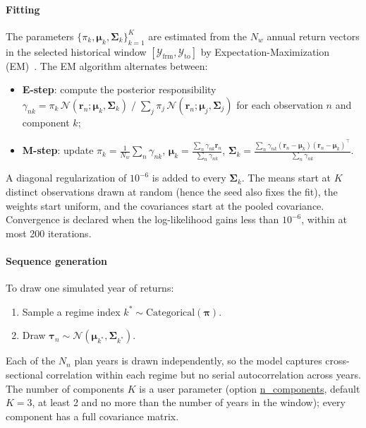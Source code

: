 \documentclass[fleqn,12pt]{report}
\newcommand{\code}[1]{\url{#1}}
\begin{document}
\paragraph*{Fitting}
The parameters $\{\pi_k, \bm{\mu}_k, \bm{\Sigma}_k\}_{k=1}^K$ are estimated
from the $N_w$ annual return vectors in the selected historical window
$[\mathcal{Y}_\mathrm{frm}, \mathcal{Y}_\mathrm{to}]$ by
Expectation-Maximization (EM)~\cite{dempster1977}.
The EM algorithm alternates between:
\begin{itemize}
    \item \textbf{E-step}: compute the posterior responsibility
          $\gamma_{nk} = \pi_k\,\mathcal{N}(\bm{r}_n;\bm{\mu}_k,\bm{\Sigma}_k)\;
          \big/\;\sum_{j}\pi_j\,\mathcal{N}(\bm{r}_n;\bm{\mu}_j,\bm{\Sigma}_j)$
          for each observation $n$ and component $k$;
    \item \textbf{M-step}: update
          $\pi_k = \frac{1}{N_w}\sum_n \gamma_{nk}$,\;
          $\bm{\mu}_k = \frac{\sum_n \gamma_{nk}\bm{r}_n}{\sum_n \gamma_{nk}}$,\;
          $\bm{\Sigma}_k = \frac{\sum_n \gamma_{nk}(\bm{r}_n - \bm{\mu}_k)(\bm{r}_n - \bm{\mu}_k)^\top}{\sum_n \gamma_{nk}}$.
\end{itemize}
A diagonal regularization of $10^{-6}$ is added to every $\bm{\Sigma}_k$.
The means start at $K$ distinct observations drawn at random (hence the seed also fixes the fit),
the weights start uniform, and the covariances start at the pooled covariance.
Convergence is declared when the log-likelihood gains less than $10^{-6}$, within at most 200
iterations.

\paragraph*{Sequence generation}
To draw one simulated year of returns:
\begin{enumerate}
    \item Sample a regime index $k^* \sim \mathrm{Categorical}(\bm{\pi})$.
    \item Draw $\bm{\tau}_n \sim \mathcal{N}(\bm{\mu}_{k^*},\bm{\Sigma}_{k^*})$.
\end{enumerate}
Each of the $N_n$ plan years is drawn independently, so the model captures
cross-sectional correlation within each regime but no serial autocorrelation
across years.
The number of components $K$ is a user parameter (option \code{n_components}, default $K=3$,
at least 2 and no more than the number of years in the window); every component has a full
covariance matrix.
\end{document}
